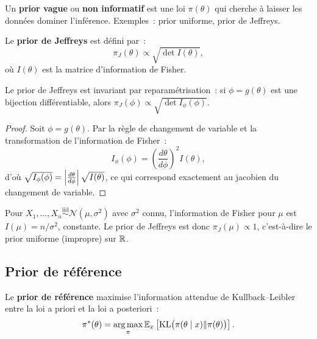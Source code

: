 \begin{definition}
Un \textbf{prior vague} ou \textbf{non informatif} est une loi
$\pi(\theta)$ qui cherche \`a laisser les donn\'ees dominer
l'inf\'erence. Exemples~: prior uniforme, prior de Jeffreys.
\end{definition}

\begin{definition}
Le \textbf{prior de Jeffreys} est d\'efini par~:
\[
  \pi_J(\theta) \propto \sqrt{\det I(\theta)},
\]
o\`u $I(\theta)$ est la matrice d'information de Fisher.
\end{definition}

\begin{proposition}
Le prior de Jeffreys est invariant par reparam\'etrisation~: si
$\phi = g(\theta)$ est une bijection diff\'erentiable, alors
$\pi_J(\phi) \propto \sqrt{\det I_\phi(\phi)}$.
\end{proposition}

\begin{proof}
Soit $\phi = g(\theta)$. Par la r\`egle de changement de variable et
la transformation de l'information de Fisher~:
\[
  I_\phi(\phi) = \left(\frac{d\theta}{d\phi}\right)^2 I(\theta),
\]
d'o\`u $\sqrt{I_\phi(\phi)} = \left| \frac{d\theta}{d\phi} \right| \sqrt{I(\theta)}$,
ce qui correspond exactement au jacobien du changement de variable.
\end{proof}

\begin{exemple}
Pour $X_1, \ldots, X_n \overset{\text{iid}}{\sim} \mathcal{N}(\mu, \sigma^2)$
avec $\sigma^2$ connu, l'information de Fisher pour $\mu$ est
$I(\mu) = n/\sigma^2$, constante. Le prior de Jeffreys est donc
$\pi_J(\mu) \propto 1$, c'est-\`a-dire le prior uniforme (impropre)
sur $\mathbb{R}$.
\end{exemple}

\subsection{Prior de r\'ef\'erence}

\begin{definition}
Le \textbf{prior de r\'ef\'erence} maximise l'information attendue de
Kullback--Leibler entre la loi a priori et la loi a posteriori~:
\[
  \pi^*(\theta) = \operatorname*{arg\,max}_{\pi} \mathbb{E}_x\left[\mathrm{KL}\big(\pi(\theta \mid x) \| \pi(\theta)\big)\right].
\]
\end{definition}


